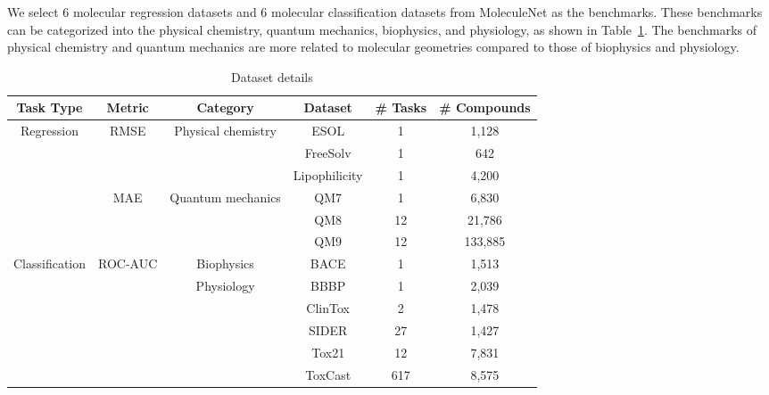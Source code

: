 \documentclass{article}
\begin{document}
We select 6 molecular regression datasets and 6 molecular classification datasets from MoleculeNet \cite{DBLP:journals/corr/WuRFGGPLP17} as the benchmarks. These benchmarks can be categorized into the physical chemistry, quantum mechanics, biophysics, and physiology, as shown in Table~\ref{tab:dataset_info}. The benchmarks of physical chemistry and quantum mechanics are more related to molecular geometries compared to those of biophysics and physiology.

\begin{table}[h]
\small
    \caption{Dataset details}
    \label{tab:dataset_info}
    \centering
\begin{tabular}{c|c|cccc}
\toprule
\multicolumn{1}{c|}{{Task Type}} & \multicolumn{1}{c}{{Metric}} & \multicolumn{1}{|c}{{Category}} & \multicolumn{1}{c}{{Dataset}} & \multicolumn{1}{c}{{\# Tasks}} & \multicolumn{1}{c}{{\# Compounds}}  \\
\midrule
\multirow{4}[8]{*}{Regression}  &  \multirow{2}[4]{*}{RMSE} & \multirow{2}[4]{*}{Physical chemistry}  & ESOL  & 1     & 1,128  \\
   &     &      & FreeSolv & 1     & 642   \\
    &      &       & Lipophilicity & 1     & 4,200\\
\cline{2-6}   & \multirow{2}[4]{*}{MAE}   & \multirow{2}[4]{*}{Quantum mechanics} &  QM7   & 1     & 6,830   \\
   &     &       & QM8   & 12    & 21,786 \\
   &     &       & QM9   & 12    & 133,885 \\
\midrule
\multirow{4}[8]{*}{Classification} & \multirow{4}[8]{*}{ROC-AUC} &  Biophysics   & BACE  & 1     & 1,513   \\
\cline{3-6}   &     & \multirow{4}[8]{*}{Physiology} & BBBP  & 1     & 2,039  \\
     &  &       & ClinTox & 2     & 1,478   \\
     &  &       & SIDER & 27    & 1,427  \\
     &  &       & Tox21 & 12    & 7,831   \\
     &  &       & ToxCast & 617   & 8,575   \\



\bottomrule
\end{tabular}
\end{table}
\end{document}
